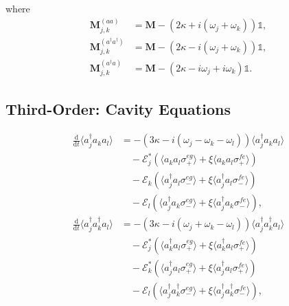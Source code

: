 \documentclass{article}
\newcommand{\ddt}{\frac{\mathrm{d}}{\mathrm{d}t}}
\begin{document}
where
\begin{subequations}
\begin{align}
	\bm{M}_{j, k}^{(aa)} &= \bm{M} - \left( 2 \kappa + i \left( \omega_{j} + \omega_{k} \right) \right) \mathbb{1}, \\
	\bm{M}_{j, k}^{(a^{\dagger} a^{\dagger})} &= \bm{M} - \left( 2 \kappa - i \left( \omega_{j} + \omega_{k} \right) \right) \mathbb{1}, \\
	\bm{M}_{j, k}^{(a^{\dagger} a)} &= \bm{M} - \left( 2 \kappa - i \omega_{j} + i \omega_{k} \right) \mathbb{1}.
\end{align}
\end{subequations}

\subsection{Third-Order: Cavity Equations}

\begin{subequations}
\begin{align}
	\ddt \langle a^{\dagger}_{j} a_{k} a_{l} \rangle &= -\left( 3 \kappa - i \left( \omega_{j} - \omega_{k} - \omega_{l} \right) \right) \langle a^{\dagger}_{j} a_{k} a_{l} \rangle \nonumber \\
	&\quad - \mathcal{E}_{j}^{*} \left( \langle a_{k} a_{l} \sigma^{eg}_{+} \rangle + \xi \langle a_{k} a_{l} \sigma^{fe}_{+} \rangle \right) \nonumber \\
	&\quad - \mathcal{E}_{k} \left( \langle a^{\dagger}_{j} a_{l} \sigma^{eg}_{-} \rangle + \xi \langle a^{\dagger}_{j} a_{l} \sigma^{fe}_{-} \rangle \right) \nonumber \\
	&\quad - \mathcal{E}_{l} \left( \langle a^{\dagger}_{j} a_{k} \sigma^{eg}_{-} \rangle + \xi \langle a^{\dagger}_{j} a_{k} \sigma^{fe}_{-} \rangle \right) , \\
	\ddt \langle a^{\dagger}_{j} a^{\dagger}_{k} a_{l} \rangle &= -\left( 3 \kappa - i \left( \omega_{j} + \omega_{k} - \omega_{l} \right) \right) \langle a^{\dagger}_{j} a^{\dagger}_{k} a_{l} \rangle \nonumber \\
	&\quad - \mathcal{E}_{j}^{*} \left( \langle a^{\dagger}_{k} a_{l} \sigma^{eg}_{+} \rangle + \xi \langle a^{\dagger}_{k} a_{l} \sigma^{fe}_{+} \rangle \right) \nonumber \\
	&\quad - \mathcal{E}_{k}^{*} \left( \langle a^{\dagger}_{j} a_{l} \sigma^{eg}_{+} \rangle + \xi \langle a^{\dagger}_{j} a_{l} \sigma^{fe}_{+} \rangle \right) \nonumber \\
	&\quad - \mathcal{E}_{l} \left( \langle a^{\dagger}_{j} a^{\dagger}_{k} \sigma^{eg}_{-} \rangle + \xi \langle a^{\dagger}_{j} a^{\dagger}_{k} \sigma^{fe}_{-} \rangle \right) ,
\end{align}
\end{subequations}
\end{document}
